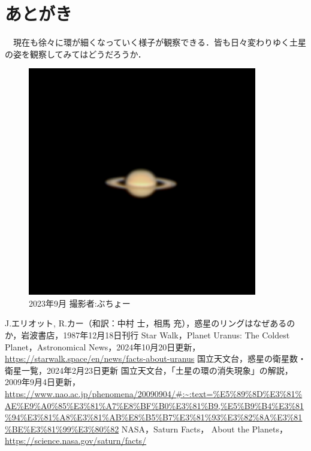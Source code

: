 \documentclass[../main]{subfiles}
\begin{document}
\section{あとがき}
　現在も徐々に環が細くなっていく様子が観察できる．皆も日々変わりゆく土星の姿を観察してみてはどうだろうか．

\begin{figure}[htbp]
    \centering
    \includegraphics[width=10cm]{sections/kurahara/部誌用/retouch_stack_MVI_4355.png}
    \caption{2023年9月 撮影者:ぶちょー}
\end{figure}

\begin{thebibliography}{10}
   J.エリオット, R.カー（和訳：中村 士，相馬 充），惑星のリングはなぜあるのか，岩波書店，1987年12月18日刊行
  Star Walk，Planet Uranus: The Coldest Planet，Astronomical News，2024年10月20日更新，\url {https://starwalk.space/en/news/facts-about-uranus}
  国立天文台，惑星の衛星数・衛星一覧，2024年2月23日更新
  国立天文台，「土星の環の消失現象」の解説，2009年9月4日更新，\url{https://www.nao.ac.jp/phenomena/20090904/#:~:text=%E5%89%8D%E3%81%AE%E9%A0%85%E3%81%A7%E8%BF%B0%E3%81%B9,%E5%B9%B4%E3%81%94%E3%81%A8%E3%81%AB%E8%B5%B7%E3%81%93%E3%82%8A%E3%81%BE%E3%81%99%E3%80%82}
  NASA，Saturn Facts，
About the Planets，\url{https://science.nasa.gov/saturn/facts/}
\end{thebibliography}
\end{document}
